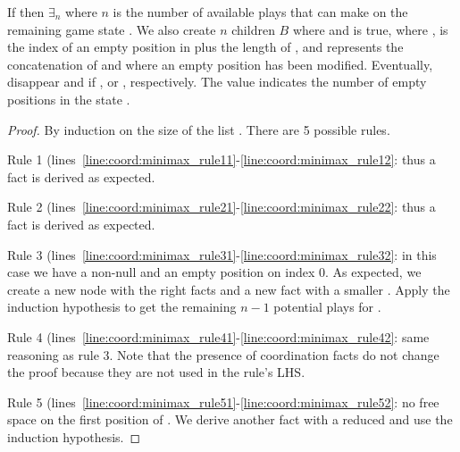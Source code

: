 \begin{lemma}

If  then $\exists_n$ where $n$ is the number of available plays that
 can make on the remaining game state .  We also
create $n$ children $B$ where  and  is true, where ,  is the index of an empty position in
 plus the length of , and  represents
the concatenation of  and  where an empty
position has been modified. Eventually,  disappear and if
,  or ,
respectively. The value  indicates the number of empty positions in
the state .

\end{lemma}

\begin{proof}
By induction on the size of the list . There are 5 possible rules.

Rule 1 (lines~\ref{line:coord:minimax_rule11}-\ref{line:coord:minimax_rule12}:
 thus a  fact is derived as expected.

Rule 2 (lines~\ref{line:coord:minimax_rule21}-\ref{line:coord:minimax_rule22}:
 thus a  fact is derived as expected.

Rule 3 (lines~\ref{line:coord:minimax_rule31}-\ref{line:coord:minimax_rule32}:
in this case we have a non-null  and an empty position on index
0. As expected, we create a new  node with the right facts and a new
 fact with a smaller . Apply the induction
hypothesis to get the remaining $n-1$ potential plays for .

Rule 4 (lines~\ref{line:coord:minimax_rule41}-\ref{line:coord:minimax_rule42}:
same reasoning as rule 3. Note that the presence of coordination facts do not
change the proof because they are not used in the rule's LHS.

Rule 5 (lines~\ref{line:coord:minimax_rule51}-\ref{line:coord:minimax_rule52}:
no free space on the first position of . We derive another
 fact with a reduced  and use the induction
hypothesis.

\end{proof}

